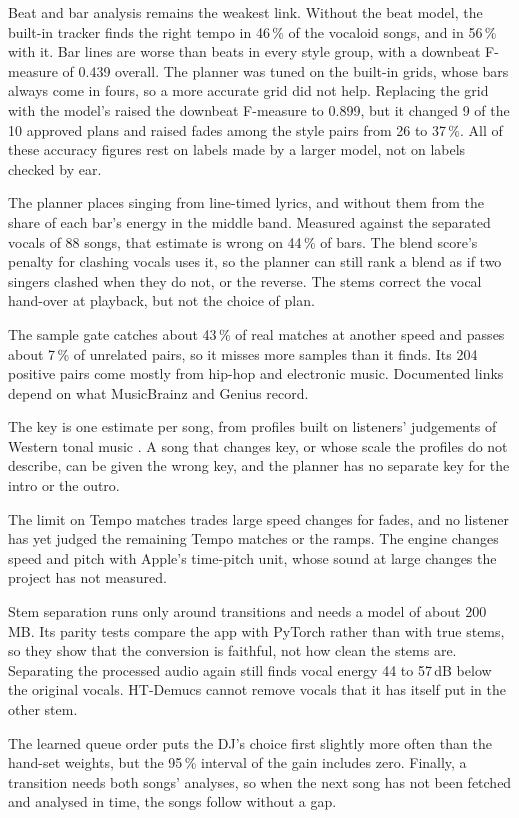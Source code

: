 \documentclass[conference,a4paper]{IEEEtran}
\newcommand{\q}[1]{\textquotedbl{}#1\textquotedbl{}}
\begin{document}
Beat and bar analysis remains the weakest link. Without the beat model, the built-in tracker finds
the right tempo in 46\,\% of the vocaloid songs, and in 56\,\% with it. Bar lines are worse than
beats in every style group, with a downbeat F-measure of 0.439 overall. The planner was tuned on the
built-in grids, whose bars always come in fours, so a more accurate grid did not help. Replacing the
grid with the model's raised the downbeat F-measure to 0.899, but it changed 9 of the 10 approved
plans and raised fades among the style pairs from 26 to 37\,\%. All of these accuracy figures rest
on labels made by a larger model, not on labels checked by ear.

The planner places singing from line-timed lyrics, and without them from the share of each bar's
energy in the middle band. Measured against the separated vocals of 88 songs, that estimate is wrong
on 44\,\% of bars. The blend score's penalty for clashing vocals uses it, so the planner can still
rank a blend as if two singers clashed when they do not, or the reverse. The stems correct the
vocal hand-over at playback, but not the choice of plan.

The sample gate catches about 43\,\% of real matches at another speed and passes about 7\,\% of
unrelated pairs, so it misses more samples than it finds. Its 204 positive pairs come mostly from
hip-hop and electronic music. Documented links depend on what MusicBrainz and Genius record.

The key is one estimate per song, from profiles built on listeners' judgements of Western tonal
music \cite{krumhansl1982}. A song that changes key, or whose scale the profiles do not describe,
can be given the wrong key, and the planner has no separate key for the intro or the outro.

The limit on Tempo matches trades large speed changes for fades, and no listener has yet judged
the remaining Tempo matches or the ramps. The engine changes speed and pitch with Apple's
time-pitch unit, whose sound at large changes the project has not measured.

Stem separation runs only around transitions and needs a model of about 200\,MB. Its parity
tests compare the app with PyTorch rather than with true stems, so they show that the conversion is
faithful, not how clean the stems are. Separating the processed audio again still finds vocal
energy 44 to 57\,dB below the original vocals. HT-Demucs cannot remove vocals that it has itself put in the \q{other} stem.

The learned queue order puts the DJ's choice first slightly more often than the hand-set weights,
but the 95\,\% interval of the gain includes zero. Finally, a transition needs both songs'
analyses, so when the next song has not been fetched and analysed in time, the songs follow without
a gap.
\end{document}
